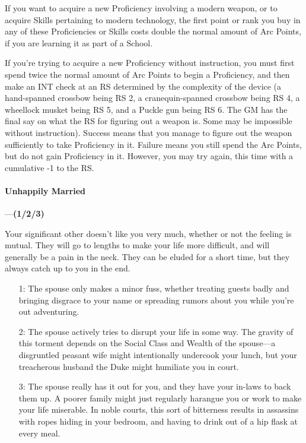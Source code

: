 \documentclass[oneside,11pt,english]{book}
\begin{document}
If you want to acquire a new Proficiency involving a modern weapon, or to acquire Skills pertaining to 
modern technology, the first point or rank you buy in any of these Proficiencies or Skills costs double the 
normal amount of Arc Points, if you are learning it as part of a School. 


If you’re trying to acquire a new Proficiency without instruction, you must
first spend twice the normal amount of Arc Points to begin a Proficiency, and
then make an INT check at an RS determined by the complexity of the device (a
hand-spanned crossbow being RS 2, a cranequin-spanned crossbow being RS 4, a
wheellock musket being RS 5, and a Puckle gun being RS 6. The GM has the final
say on what the RS for figuring out a weapon is. Some may be impossible without
instruction). Success means that you manage to figure out the weapon
sufficiently to take Proficiency in it. Failure means you still spend the Arc
Points, but do not gain Proficiency in it. However, you may try again, this time
with a cumulative -1 to the RS.  
\paragraph{\label{bane:Unhappily Married}Unhappily
  Married}---\quad\textbf{(1/2/3) }\par 
Your significant other doesn’t like you very much, whether or not the feeling is
mutual. They will go to lengths to make your life more difficult, and will
generally be a pain in the neck. They can be eluded for a short time, but they
always catch up to you in the end. 
\begin{itemize}
\item [1:] The spouse only makes a minor fuss, whether treating guests badly and
  bringing disgrace to your name or spreading rumors about you while you’re out
  adventuring.  
\item [2:] The spouse actively tries to disrupt your life in some way. The
  gravity of this torment depends on the Social Class and Wealth of the spouse—a
  disgruntled peasant wife might intentionally undercook your lunch, but your
  treacherous husband the Duke might humiliate you in court.  
\item [3:] The spouse really has it out for you, and they have your in-laws to
  back them up. A poorer family might just regularly harangue you or work to
  make your life miserable. In noble courts, this sort of bitterness results in
  assassins with ropes hiding in your bedroom, and having to drink out of a hip
  flask at every meal. 
\end{itemize}
\end{document}
